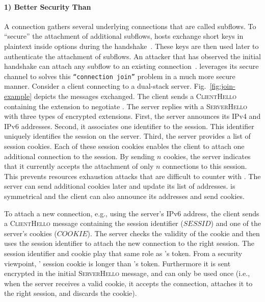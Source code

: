 \paragraph*{1) Better Security Than \mptcp} A \mptcp connection gathers several
underlying connections that are called subflows. To ``secure'' the attachment of
additional subflows, \mptcp hosts exchange short keys in plaintext inside \tcp
options during the \tcp handshake~\cite{rfc6824, rfc8684}. These keys are then
used later to authenticate the attachment of subflows. An
attacker that has observed the initial handshake can attach any subflow to an
existing \mptcp connection~\cite{rfc6181}. \tcpls leverages its secure channel to solves this
\texttt{``connection join''} problem in a much more secure manner. Consider a
client connecting to a dual-stack server. Fig.~\ref{fig:join-example} depicts
the \tls messages exchanged. The client sends a \textsc{ClientHello} containing
the \tcpls extension to negotiate \tcpls. The server replies with a
\textsc{ServerHello} with three types of encrypted extensions.
First, the server announces its IPv4 and IPv6 addresses. Second, it
associates one identifier to the \tcpls session.
This identifier uniquely identifies the \tcpls session on the server.
Third, the server provides a list
of \tcpls session cookies.
Each of these session cookies enables the client to
attach one additional \tcp connection to the \tcpls session. By sending $n$
cookies, the server indicates that it currently accepts the attachment of only
$n$ \tcp connections to this session. This prevents resources exhaustion attacks
that are difficult to counter with \mptcp. The server can
send additional cookies later and update its list of addresses. \tcpls is
symmetrical and the client can also announce its addresses and send cookies.

To attach a new connection, e.g., using the server's IPv6 address, the client
sends a \textsc{ClientHello} message containing the session identifier
($SESSID$) and one of the server's cookies ($COOKIE$). The server checks the
validity of the cookie and then uses the session identifier to attach the new
\tcp connection to the right \tcpls session. The session identifier and cookie
play that same role as \mptcp's token. From a security viewpoint, \tcpls'
session
cookie is longer than \mptcp's token. Furthermore it is sent encrypted in the
initial \textsc{ServerHello} message, and can only be used once (i.e., when the
server receives a valid cookie, it accepts the connection, attaches it to the
right \tcpls session, and discards the cookie).

